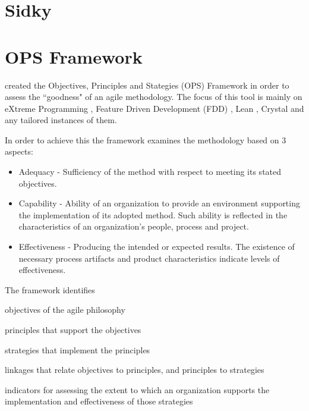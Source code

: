 \section{Sidky}

\section{OPS Framework} %
\citet{sventha_dissertation} created the Objectives, Principles and Stategies (OPS) Framework in order to assess the ``goodness" of an agile methodology. The focus of this tool is mainly on eXtreme Programming \cite{Beck:2004:EPE:1076267}, Feature Driven Development (FDD) \cite{Palmer:2001:PGF:600044}, Lean \cite{Poppendieck:2003:LSD:829556}, Crystal \cite{Cockburn:2004:CCH:1406822} and any tailored instances of them.

In order to achieve this the framework examines the methodology based on 3 aspects:
\begin{itemize}
\item Adequacy - Sufficiency of the method with respect to meeting its stated objectives.
\item Capability - Ability of an organization to provide an environment supporting the implementation of its adopted method. Such ability is reflected in the characteristics of an organization's people, process
and project.
\item Effectiveness - Producing the intended or expected results. The existence of necessary process artifacts and product characteristics indicate levels of effectiveness.
\end{itemize}


The framework identifies 
\begin{inparaenum} [a\upshape)]
\item objectives of the agile philosophy
\item principles that support the objectives
\item strategies that implement the principles
\item linkages that relate objectives to
principles, and principles to strategies
\item indicators for assessing the extent to which an organization supports the implementation and effectiveness of those strategies
\end{inparaenum}


